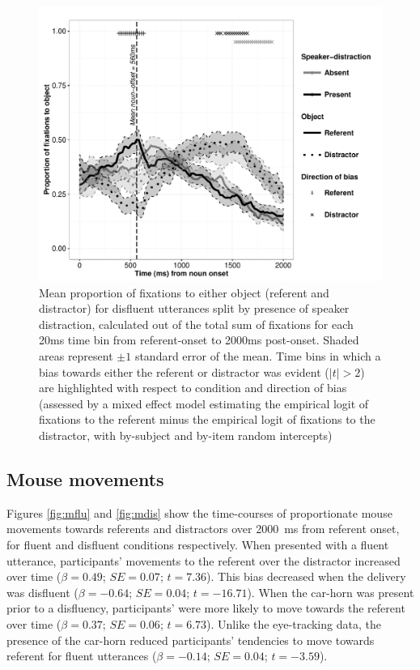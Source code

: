 \documentclass[a4paper,man,natbib]{apa6}
\newcommand*{\SE}{\mathit{SE}} %
\begin{document}
\begin{figure}[Ht] %
  \centering
	\includegraphics[width=\linewidth]{eye_disf.pdf}
  \caption{Mean proportion of fixations to either object (referent and distractor) for disfluent utterances split by presence of speaker distraction, calculated out of the total sum of fixations for each 20ms time bin from referent-onset to 2000ms post-onset. Shaded areas represent $\pm 1$ standard error of the mean. Time bins in which a bias towards either the referent or distractor was evident ($|t|>2$) are highlighted with respect to condition and direction of bias (assessed by a mixed effect model estimating the empirical logit of fixations to the referent minus the empirical logit of fixations to the distractor, with by-subject and by-item random intercepts)}
  \label{fig:diseye}
\end{figure}

\subsection{Mouse movements}
Figures \ref{fig:mflu} and \ref{fig:mdis} show the time-courses of proportionate mouse movements towards referents and distractors over 2000~ms from referent onset, for fluent and disfluent conditions respectively. 
When presented with a fluent utterance, participants' movements to the referent over the distractor increased over time ($\beta = 0.49$; $\SE = 0.07$; $t=7.36$). 
This bias decreased when the delivery was disfluent ($\beta = -0.64$; $\SE = 0.04$; $t=-16.71$). 
When the car-horn was present prior to a disfluency, participants' were more likely to move towards the referent over time ($\beta = 0.37$; $\SE = 0.06$; $t=6.73$). 
Unlike the eye-tracking data, the presence of the car-horn reduced participants' tendencies to move towards referent for fluent utterances ($\beta = -0.14$; $\SE = 0.04$; $t=-3.59$).
\end{document}
